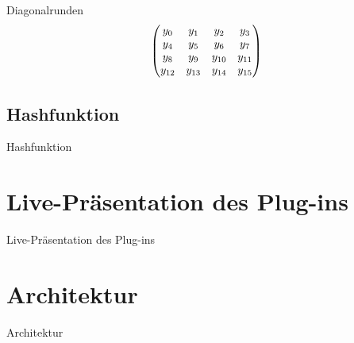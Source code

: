\documentclass{beamer}
\newcommand{\tikzmark}[2]{
    \tikz[overlay,remember picture,baseline]
    \node[anchor=base] (#1){$#2$};
}
\begin{document}
\begin{frame}{Diagonalrunden}
\begin{equation*}
\begin{pmatrix}
y_0 & y_1 & y_2 & \tikzmark{3}{y_3} \\
\tikzmark{4}{y_4} &y_5 & y_6 & y_7 \\
y_8 & \tikzmark{9}{y_9} & y_{10} & y_{11} \\
y_{12} & y_{13} & \tikzmark{14}{y_{14}} & y_{15} \\
\end{pmatrix}
\end{equation*}
\end{frame}

\subsection{Hashfunktion}
\begin{frame}{Hashfunktion}
\end{frame}

\section{Live-Präsentation des Plug-ins}
\begin{frame}{Live-Präsentation des Plug-ins}
\end{frame}

\section{Architektur}
\begin{frame}{Architektur}
\end{frame}
\end{document}
